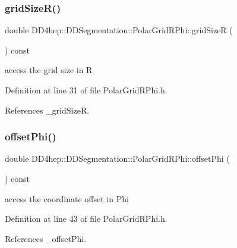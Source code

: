 \subsubsection{\texorpdfstring{grid\+Size\+R()}{gridSizeR()}}
{\footnotesize\ttfamily double D\+D4hep\+::\+D\+D\+Segmentation\+::\+Polar\+Grid\+R\+Phi\+::grid\+SizeR (\begin{DoxyParamCaption}{ }\end{DoxyParamCaption}) const\hspace{0.3cm}{\ttfamily [inline]}}



access the grid size in R 



Definition at line 31 of file Polar\+Grid\+R\+Phi.\+h.



References \+\_\+grid\+SizeR.

\hypertarget{class_d_d4hep_1_1_d_d_segmentation_1_1_polar_grid_r_phi_af0b7a0b03f4fb258c57306aa8175a8a0}{}\label{class_d_d4hep_1_1_d_d_segmentation_1_1_polar_grid_r_phi_af0b7a0b03f4fb258c57306aa8175a8a0} 
\subsubsection{\texorpdfstring{offset\+Phi()}{offsetPhi()}}
{\footnotesize\ttfamily double D\+D4hep\+::\+D\+D\+Segmentation\+::\+Polar\+Grid\+R\+Phi\+::offset\+Phi (\begin{DoxyParamCaption}{ }\end{DoxyParamCaption}) const\hspace{0.3cm}{\ttfamily [inline]}}



access the coordinate offset in Phi 



Definition at line 43 of file Polar\+Grid\+R\+Phi.\+h.



References \+\_\+offset\+Phi.

\hypertarget{class_d_d4hep_1_1_d_d_segmentation_1_1_polar_grid_r_phi_a9fad9e5f76c9947d1f86445ff09696b0}{}\label{class_d_d4hep_1_1_d_d_segmentation_1_1_polar_grid_r_phi_a9fad9e5f76c9947d1f86445ff09696b0} 

